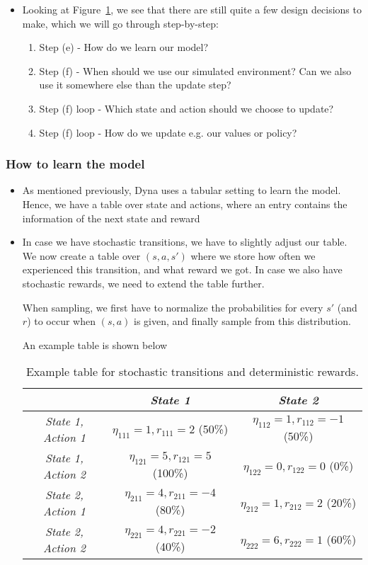 \begin{itemize}
\begin{figure}[ht!]
		\label{fig:rl_model_based_dyna_Q_algorithm}
	\end{figure}
	\item Looking at Figure~\ref{fig:rl_model_based_dyna_Q_algorithm}, we see that there are still quite a few design decisions to make, which we will go through step-by-step:
	\begin{enumerate}
		\item Step (e) - How do we learn our model?
		\item Step (f) - When should we use our simulated environment? Can we also use it somewhere else than the update step?
		\item Step (f) loop - Which state and action should we choose to update?
		\item Step (f) loop - How do we update e.g. our values or policy?
	\end{enumerate} 
\end{itemize}
\subsubsection{How to learn the model}
\begin{itemize}
	\item As mentioned previously, Dyna uses a tabular setting to learn the model. Hence, we have a table over state and actions, where an entry contains the information of the next state and reward
	\item In case we have stochastic transitions, we have to slightly adjust our table. We now create a table over $(s,a,s')$ where we store how often we experienced this transition, and what reward we got. In case we also have stochastic rewards, we need to extend the table further.
	
	When sampling, we first have to normalize the probabilities for every $s'$ (and $r$) to occur when $(s,a)$ is given, and finally sample from this distribution.
	
	An example table is shown below
	\begin{table}[ht!]
		\centering
		\begin{tabular}{c|cc}
			& \textit{State 1} & \textit{State 2}\\
			\hline
			\textit{State 1, Action 1} & $\eta_{111}=1, r_{111}=2$ (50\%) & $\eta_{112}=1, r_{112}=-1$ (50\%)\\
			\textit{State 1, Action 2} & $\eta_{121}=5, r_{121}=5$ (100\%) & $\eta_{122}=0, r_{122}=0$ (0\%) \\
			\textit{State 2, Action 1}  & $\eta_{211}=4, r_{211}=-4$ (80\%) & $\eta_{212}=1, r_{212}=2$ (20\%)  \\
			\textit{State 2, Action 2} & $\eta_{221}=4, r_{221}=-2$ (40\%) & $\eta_{222}=6, r_{222}=1$ (60\%) \\
		\end{tabular}
		\caption{Example table for stochastic transitions and deterministic rewards.}
	\end{table}
\end{itemize}

